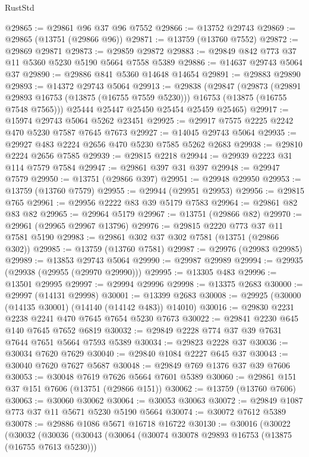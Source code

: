 \begin{lexlean}{RustStd}
\begin{coremodule}
@29865 := @29861 @96 @37 @96 @7552
@29866 := @13752 @29743
@29869 := @29865 (@13751 (@29866 @96))
@29871 := @13759 (@13760 @7552)
@29872 := @29869 @29871
@29873 := @29859 @29872
@29883 := @29849 @842 @773 @37 @11 @5360 @5230 @5190 @5664 @7558 @5389
@29886 := @14637 @29743 @5064 @37
@29890 := @29886 @841 @5360 @14648 @14654
@29891 := @29883 @29890
@29893 := @14372 @29743 @5064
@29913 := @29838
    (@29847
      (@29873
        (@29891 @29893 @16753 (@13875 (@16755 @7559 @5230)))
        @16753
        (@13875 (@16755 @7548 @7565)))
      @25444
      @25447
      @25450
      @25454
      @25459
      @25465)
@29917 := @15974 @29743 @5064 @5262 @23451
@29925 := @29917 @7575 @2225 @2242 @470 @5230 @7587 @7645 @7673
@29927 := @14045 @29743 @5064
@29935 := @29927 @483 @2224 @2656 @470 @5230 @7585 @5262 @2683
@29938 := @29810 @2224 @2656 @7585
@29939 := @29815 @2218
@29944 := @29939 @2223 @31 @114 @7579 @7584
@29947 := @29861 @397 @31 @397
@29948 := @29947 @7579
@29950 := @13751 (@29866 @397)
@29951 := @29948 @29950
@29953 := @13759 (@13760 @7579)
@29955 := @29944 (@29951 @29953)
@29956 := @29815 @765
@29961 := @29956 @2222 @83 @39 @5179 @7583
@29964 := @29861 @82 @83 @82
@29965 := @29964 @5179
@29967 := @13751 (@29866 @82)
@29970 := @29961 (@29965 @29967 @13796)
@29976 := @29815 @2220 @773 @37 @11 @7581 @5190
@29983 := @29861 @302 @37 @302 @7581 (@13751 (@29866 @302))
@29985 := @13759 (@13760 @7581)
@29987 := @29976 (@29983 @29985)
@29989 := @13853 @29743 @5064
@29990 := @29987 @29989
@29994 := @29935 (@29938 (@29955 (@29970 @29990)))
@29995 := @13305 @483
@29996 := @13501 @29995
@29997 := @29994 @29996
@29998 := @13375 @2683
@30000 := @29997 (@14131 @29998)
@30001 := @13399 @2683
@30008 := @29925 (@30000 (@14135 @30001) (@14140 (@14142 @483)) @14010)
@30016 := @29830 @2231 @2238 @2241 @470 @7645 @7654 @5230 @7673
@30022 := @29841 @2230 @645 @140 @7645 @7652 @6819
@30032 := @29849 @2228 @774 @37 @39 @7631 @7644 @7651 @5664 @7593 @5389
@30034 := @29823 @2228 @37
@30036 := @30034 @7620 @7629
@30040 := @29840 @1084 @2227 @645 @37
@30043 := @30040 @7620 @7627 @5687
@30048 := @29849 @769 @1376 @37 @39 @7606
@30053 := @30048 @7619 @7626 @5664 @7601 @5389
@30060 := @29861 @151 @37 @151 @7606 (@13751 (@29866 @151))
@30062 := @13759 (@13760 @7606)
@30063 := @30060 @30062
@30064 := @30053 @30063
@30072 := @29849 @1087 @773 @37 @11 @5671 @5230 @5190 @5664
@30074 := @30072 @7612 @5389
@30078 := @29886 @1086 @5671 @16718 @16722
@30130 := @30016
    (@30022
      (@30032
        (@30036
          (@30043
            (@30064
              (@30074 @30078 @29893 @16753 (@13875 (@16755 @7613 @5230)))

\end{coremodule}
\end{lexlean}
